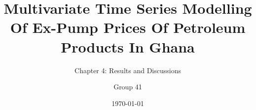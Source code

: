 \documentclass{beamer}
\title{Multivariate Time Series Modelling Of Ex-Pump Prices Of Petroleum Products In Ghana}
\subtitle{Chapter 4: Results and Discussions}
\author{Group 41}
\institute{Kwame Nkrumah University of Science and Technology}
\date{\today}
\begin{document}
	
	
	\begin{frame}
		\titlepage
	\end{frame}
\end{document}
